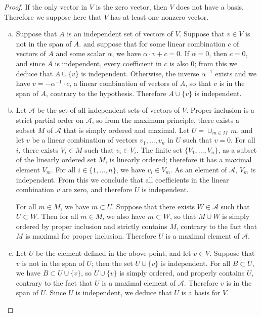 \documentclass[11pt,a4paper,twoside]{article}
\theoremstyle{definition}
\begin{document}
\begin{proof} \hfill

  If the only vector in $V$ is the zero vector, then $V$ does not have a basis. Therefore we
  suppose here that $V$ has at least one nonzero vector.

  \begin{enumerate}[(a)]

  \item Suppose that $A$ is an independent set of vectors of $V$. Suppose that $v \in V$
    is not in the span of $A$. and suppose that for some linear combination $c$ of vectors of $A$
    and some scalar $\alpha$, we have $\alpha \cdot v + c = 0$. If $\alpha = 0$, then $c = 0$,
    and since $A$ is independent, every coefficient in $c$ is also $0$; from this we deduce that
    $A \cup \{ v \}$ is independent. Otherwise, the inverse $\alpha^{-1}$ exists and we have
    $v = - \alpha^{-1} \cdot c$, a linear combination of vectors of $A$, so that $v$ is in the span
    of $A$, contrary to the hypothesis. Therefore $A \cup \{ v \}$ is independent.

  \item Let $\mathscr{A}$ be the set of all independent sets of vectors of $V$. Proper inclusion
    is a strict partial order on $\mathscr{A}$, so from the maximum principle, there exists a subset
    $M$ of $\mathscr{A}$ that is simply ordered and maximal. Let $U = \cup_{m \in M} \,m$,
    and let $v$ be a linear combination of vectors $v_1, \dotsc, v_n$ in $U$ such that $v = 0$.
    For all $i$, there exists $V_i \in M$ such that $v_i \in V_i$. The finite set $\{ V_1, \dotsc, V_n \}$,
    as a subset of the linearly ordered set $M$, is linearly ordered; therefore it has
    a maximal element $V_m$. For all $i \in \{ 1, \dotsc, n \}$, we have $v_i \in V_m$. As an element
    of $\mathscr{A}$, $V_m$ is independent. From this we conclude that all coefficients in the
    linear combination $v$ are zero, and therefore $U$ is independent.

    For all $m \in M$, we have $m \subset U$. Suppose that there exists $W \in \mathscr{A}$
    such that $U \subset W$. Then for all $m \in M$, we also have $m \subset W$, so that $M \cup W$
    is simply ordered by proper inclusion and strictly contains $M$, contrary to the fact that
    $M$ is maximal for proper inclusion. Therefore $U$ is a maximal element of $\mathscr{A}$.

  \item Let $U$ be the element defined in the above point, and let $v \in V$. Suppose that $v$ is
    not in the span of $U$; then the set $U \cup \{ v \}$ is independent. For all $B \subset U$,
    we have $B \subset U \cup \{ v \}$, so $U \cup \{ v \}$ is simply ordered, and properly contains $U$,
    contrary to the fact that $U$ is a maximal element of $\mathscr{A}$.
    Therefore $v$ is in the span of $U$. Since $U$ is independent, we deduce that $U$ is a basis for $V$.

  \end{enumerate}

\end{proof}
\end{document}
